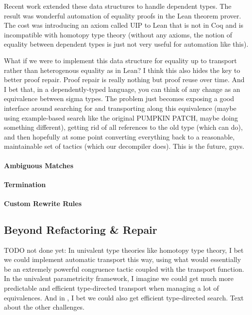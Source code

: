 Recent work extended these data structures to handle dependent types. The result was wonderful automation of equality proofs in the Lean theorem prover. The cost was introducing an axiom called UIP to Lean that is not in Coq and is incompatible with homotopy type theory (without any axioms, the notion of equality between dependent types is just not very useful for automation like this).

What if we were to implement this data structure for equality up to transport rather than heterogenous equality as in Lean?
I think this also hides the key to better proof repair. Proof repair is really nothing but proof reuse over time. And I bet that, in a dependently-typed language, you can think of any change as an equivalence between sigma types. The problem just becomes exposing a good interface around searching for and transporting along this equivalence (maybe using example-based search like the original PUMPKIN PATCH, maybe doing something different), getting rid of all references to the old type (which \toolname can do), and then hopefully at some point converting everything back to a reasonable, maintainable set of tactics (which our decompiler does). This is the future, guys.

\paragraph{Ambiguous Matches}

\paragraph{Termination}

\paragraph{Custom Rewrite Rules}

\subsection{Beyond Refactoring \& Repair}

TODO not done yet: In univalent type theories like homotopy type theory, I bet we could implement automatic transport this way, using what would essentially be an extremely powerful congruence tactic coupled with the transport function. In the univalent parametricity framework, I imagine we could get much more predictable and efficient type-directed transport when managing a lot of equivalences. And in \toolname, I bet we could also get efficient type-directed search. Text about the other challenges.

